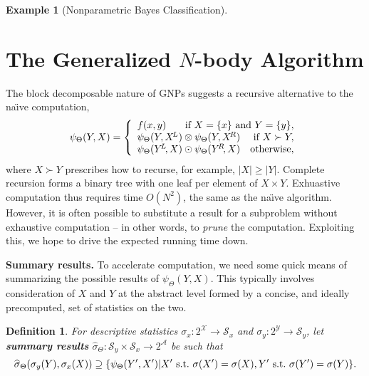 \documentclass{article}
\newtheorem{definition} {Definition}
\newtheorem{example} {Example}
\newcommand{\GNP}[1][\psi]{{#1}_{\Theta}}
\newcommand{\sigmahat}{\mathbin{\widehat{\sigma}}}
\newcommand{\st}{{\rm~s.t.~}}
\begin{document}
\begin{example}[Nonparametric Bayes Classification]
\end{example}

\section{The Generalized $N$-body Algorithm}

The block decomposable nature of GNPs suggests a recursive alternative
to the na\"{\i}ve computation,
\[
\GNP(Y,X) = \left\{ \begin{array}{lrr}
  f(x,y) & \multicolumn{2}{r}{\mbox{\rm if } X = \{x\} \mbox{ \rm and } Y = \{y\},} \\
  \multicolumn{2}{l}{\GNP(Y,X^{\!L}) \otimes \GNP(Y,X^{\!R})} & \mbox{\rm if } X \succ Y, \\
  \multicolumn{2}{l}{\GNP(Y^{\!L}\!,X) \odot \GNP(Y^{\!R}\!,X)} & \mbox{\rm otherwise},
\end{array} \right.
\]
where $X \succ Y$ prescribes how to recurse,
for example, $|X| \geq |Y|$.
Complete recursion forms a binary tree with one leaf per
element of $X \times Y$.  Exhuastive computation thus requires time
$O(N^2)$, the same as the na\"{\i}ve algorithm.
However, it is often possible to substitute a result for a subproblem without exhaustive computation -- in other words, to {\it prune} the computation.
Exploiting this, we hope to drive the expected running time down.


{\bf Summary results.}
To accelerate computation, we need some quick means of summarizing the possible results of $\GNP(Y,X)$.
This typically involves consideration of $X$ and $Y$ at the abstract level formed by a concise, and ideally precomputed, set of statistics on the two.
\begin{definition}
  For descriptive statistics $\sigma_x \colon 2^{\mathcal{X}} \to
  \mathcal{S}_x$ and $\sigma_y \colon 2^{\mathcal{Y}} \to
  \mathcal{S}_y$, let {\bf summary results} $\GNP[\sigmahat] \colon
  \mathcal{S}_y \times \mathcal{S}_x \to 2^\mathcal{A}$ be such that
  \[
  \GNP[\sigmahat](\sigma_y(Y),\sigma_x(X)) \supseteq \{\GNP(Y',X') | X' \st \sigma(X') = \sigma(X), Y' \st \sigma(Y') = \sigma(Y)\}.
  \]
\end{definition}
\end{document}
